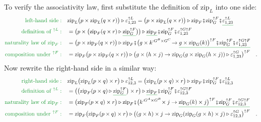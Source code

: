 To verify the associativity law, first substitute the definition of
$\text{zip}_{L}$ into one side:
\begin{align*}
{\color{greenunder}\text{left-hand side}:}\quad & \text{zip}_{L}\big(p\times\text{zip}_{L}(q\times r)\big)\triangleright\varepsilon_{1,23}^{\uparrow L}=\big(p\times\text{zip}_{L}(q\times r)\big)\triangleright\text{zip}_{F}\bef\text{zip}_{G}^{\uparrow F}\bef\gunderline{\varepsilon_{1,23}^{\uparrow L}}\\
{\color{greenunder}\text{definition of }^{\uparrow L}:}\quad & =\big(p\times\big(\text{zip}_{F}(q\times r)\triangleright\gunderline{\text{zip}_{G}^{\uparrow F}}\big)\big)\triangleright\gunderline{\text{zip}_{F}}\bef\text{zip}_{G}^{\uparrow F}\bef\varepsilon_{1,23}^{\uparrow G\uparrow F}\\
{\color{greenunder}\text{naturality law of }\text{zip}_{F}:}\quad & =\big(p\times\text{zip}_{F}(q\times r)\big)\triangleright\text{zip}_{F}\bef\big(g\times k^{:G^{B}\times G^{C}}\!\rightarrow\gunderline{g\times\text{zip}_{G}(k)\big)^{\uparrow F}\bef\text{zip}_{G}^{\uparrow F}\bef\varepsilon_{1,23}^{\uparrow G\uparrow F}}\\
{\color{greenunder}\text{composition under }^{\uparrow F}:}\quad & =\text{zip}_{F}\big(p\times\text{zip}_{F}(q\times r)\big)\triangleright\big(g\times(h\times j)\rightarrow\text{zip}_{G}(g\times\text{zip}_{G}(h\times j))\triangleright\varepsilon_{1,23}^{\uparrow G}\big)^{\uparrow F}\quad.
\end{align*}
Now rewrite the right-hand side in a similar way:
\begin{align*}
{\color{greenunder}\text{right-hand side}:}\quad & \text{zip}_{L}\big(\text{zip}_{L}(p\times q)\times r\big)\triangleright\varepsilon_{12,3}^{\uparrow L}=\big(\text{zip}_{L}(p\times q)\times r\big)\triangleright\text{zip}_{F}\bef\text{zip}_{G}^{\uparrow F}\bef\varepsilon_{12,3}^{\uparrow L}\\
{\color{greenunder}\text{definition of }^{\uparrow L}:}\quad & =\big(\big(\text{zip}_{F}(p\times q)\triangleright\gunderline{\text{zip}_{G}^{\uparrow F}}\big)\times r\big)\triangleright\gunderline{\text{zip}_{F}}\bef\text{zip}_{G}^{\uparrow F}\bef\varepsilon_{12,3}^{\uparrow G\uparrow F}\\
{\color{greenunder}\text{naturality law of }\text{zip}_{F}:}\quad & =\big(\text{zip}_{F}(p\times q)\times r\big)\triangleright\text{zip}_{F}\bef\big(k^{:G^{A}\times G^{B}}\!\times j\rightarrow\gunderline{\text{zip}_{G}(k)\times j\big)^{\uparrow F}\bef\text{zip}_{G}^{\uparrow F}\bef\varepsilon_{12,3}^{\uparrow G\uparrow F}}\\
{\color{greenunder}\text{composition under }^{\uparrow F}:}\quad & =\text{zip}_{F}\big(\text{zip}_{F}(p\times q)\times r\big)\triangleright\big((g\times h)\times j\rightarrow\text{zip}_{G}(\text{zip}_{G}(g\times h)\times j)\triangleright\varepsilon_{12,3}^{\uparrow G}\big)^{\uparrow F}\quad.
\end{align*}
